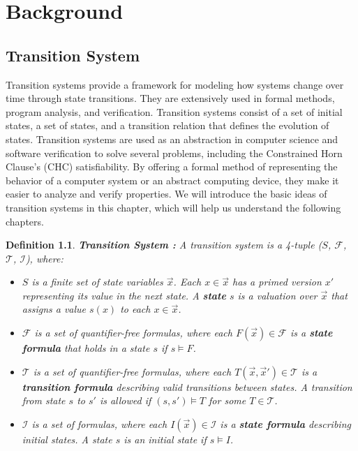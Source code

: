 \chapter{Background}

\newtheorem{definition}{Definition}
\section{Transition System}
\noindent Transition systems provide a framework for modeling how systems change over time through state transitions. They are extensively used in formal methods, program analysis, and verification. Transition systems consist of a set of initial states, a set of states, and a transition relation that defines the evolution of states. Transition systems are used as an abstraction in computer science and software verification to solve several problems, including the Constrained Horn Clause's (CHC) satisfiability. By offering a formal method of representing the behavior of a computer system or an abstract computing device, they make it easier to analyze and verify properties. We will introduce the basic ideas of transition systems in this chapter, which will help us understand the following chapters.

\begin{definition}
    \textbf{Transition System \cite{7886665}:}
    A transition system is a 4-tuple ($S$, $\mathcal{F}$, $\mathcal{T}$, $\mathcal{I}$), where:
    \begin{itemize}
        \item \( S \) is a finite set of state variables \( \vec{x} \). Each \( x \in \vec{x} \) has a primed version \( x' \) representing its value in the next state. A \textbf{state} \( s \) is a valuation over \( \vec{x} \) that assigns a value \( s(x) \) to each \( x \in \vec{x} \).
        \item \( \mathcal{F} \) is a set of quantifier-free formulas, where each \( F(\vec{x}) \in \mathcal{F} \) is a \textbf{state formula} that holds in a state \( s \) if \( s \models F \).
        \item \( \mathcal{T} \) is a set of quantifier-free formulas, where each \( T(\vec{x}, \vec{x}') \in \mathcal{T} \) is a \textbf{transition formula} describing valid transitions between states. A transition from state \( s \) to \( s' \) is allowed if \( (s, s') \models T \) for some \( T \in \mathcal{T} \).
        \item \( \mathcal{I} \) is a set of formulas, where each \( I(\vec{x}) \in \mathcal{I} \) is a \textbf{state formula} describing initial states. A state \( s \) is an initial state if \( s \models I \).
    \end{itemize}
\end{definition}

